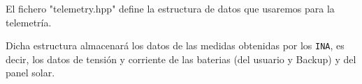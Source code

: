 
El fichero "telemetry.hpp" define la estructura de datos que usaremos para la telemetría.

Dicha estructura almacenará los datos de las medidas obtenidas por los \texttt{INA}, es decir, los datos de tensión y corriente de las baterias (del usuario y Backup) y del panel solar.

